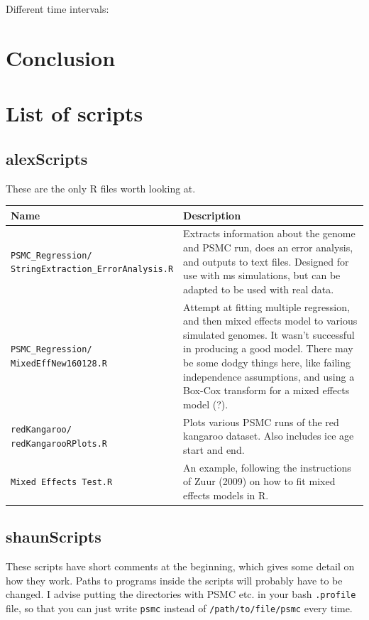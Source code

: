 \documentclass[11pt,a4paper]{article}
\begin{document}
Different time intervals:


\section{Conclusion}


{}
\newpage

\appendix
\section{List of scripts}
\subsection{alexScripts}
These are the only R files worth looking at.
\begin{table}[h]
\begin{tabular}{p{6.5cm}p{8.5cm}}
  \hline
  \textbf{Name} & \textbf{Description} \\ 
  \hline
\parbox[t]{5cm}{\texttt{PSMC\_Regression/}\\ \texttt{StringExtraction\_ErrorAnalysis.R}} & Extracts information about the genome and PSMC run, does an error analysis, and outputs to text files. Designed for use with ms simulations, but can be adapted to be used with real data.\\ \hline
  \parbox[t]{5cm}{\texttt{PSMC\_Regression/}\\ \texttt{MixedEffNew160128.R}} & Attempt at fitting multiple regression, and then mixed effects model to various simulated genomes. It wasn't successful in producing a good model. There may be some dodgy things here, like failing independence assumptions, and using a Box-Cox transform for a mixed effects model (?). \\ \hline
  \parbox[t]{5cm}{\texttt{redKangaroo/}\\ \texttt{redKangarooRPlots.R}} & Plots various PSMC runs of the red kangaroo dataset. Also includes ice age start and end. \\ \hline
  \texttt{Mixed Effects Test.R} & An example, following the instructions of Zuur (2009) on how to fit mixed effects models in R.
  \hline
\end{tabular}
\end{table}

\subsection{shaunScripts}
These scripts have short comments at the beginning, which gives some detail on how they work. Paths to programs inside the scripts will probably have to be changed. I advise putting the directories with PSMC etc. in your bash \verb|.profile| file, so that you can just write \verb|psmc| instead of \verb|/path/to/file/psmc| every time.
\end{document}
